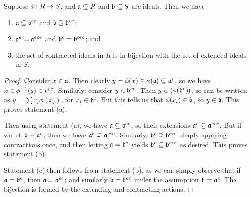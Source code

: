 \begin{proposition}\label{prop:extension-contraction-properties}
    Suppose \(\phi\colon R\to S\),
    and \(\mathfrak{a} \subseteq R\) and \(\mathfrak{b} \subseteq S\) are ideals.
    Then we have
    \begin{enumerate}[label={(\alph*)}, itemsep=0mm]
        \item \(\mathfrak{a} \subseteq \mathfrak{a}^{ec}\) and \(\mathfrak{b} \supseteq \mathfrak{b}^{ce}\);
        \item \(\mathfrak{a}^e = \mathfrak{a}^{ece}\) and \(\mathfrak{b}^c = \mathfrak{b}^{cec}\); and
        \item the set of contracted ideals in \(R\) is in bijection with the set of extended ideals in \(S\).
    \end{enumerate}
\end{proposition}
\begin{proof}
    Consider \(x \in \mathfrak{a}\).
    Then clearly \(y = \phi(x) \in \phi(\mathfrak{a}) \subseteq \mathfrak{a}^e\),
    so we have \(x \in \phi^{-1}(y) \in \mathfrak{a}^{ec}\).
    Similarly, consider \(y \in \mathfrak{b}^{ce}\).
    Then \(y \in (\phi(\mathfrak{b}^c))\),
    so can be written as \(y = \sum r_i \phi(x_i)\),
    for \(x_i \in \mathfrak{b}^c\).
    But this tells us that \(\phi(x_i) \in \mathfrak{b}\),
    so \(y \in \mathfrak{b}\).
    This proves statement (a).

    Then using statement (a),
    we have \(\mathfrak{a} \subseteq \mathfrak{a}^{ec}\),
    so their extensions \(\mathfrak{a}^e \subseteq \mathfrak{a}^{ece}\).
    But if we let \(\mathfrak{b} = \mathfrak{a}^e\),
    then we have \(\mathfrak{a}^e \supseteq \mathfrak{a}^{ece}\).
    Similarly, \(\mathfrak{b}^c \supseteq \mathfrak{b}^{cec}\) simply applying contractions once,
    and then letting \(\mathfrak{a} = \mathfrak{b}^c\) yields
    \(\mathfrak{b}^c \subseteq \mathfrak{b}^{cec}\) as desired.
    This proves statement (b).

    Statement (c) then follows from statement (b),
    as we can simply observe that if \(\mathfrak{a} = \mathfrak{b}^c\),
    then \(\mathfrak{a} = \mathfrak{a}^{ec}\);
    and similarly \(\mathfrak{b} = \mathfrak{b}^{ce}\) under the assumption \(\mathfrak{b} = \mathfrak{a}^e\).
    The bijection is formed by the extending and contracting actions.
\end{proof}
